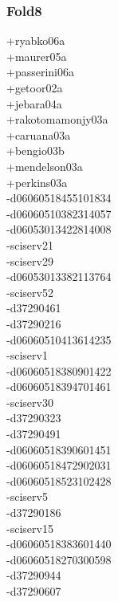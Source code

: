 \begin{multicols}{4}
\subsubsection*{Fold8}
+ryabko06a\\
+maurer05a\\
+passerini06a\\
+getoor02a\\
+jebara04a\\
+rakotomamonjy03a\\
+caruana03a\\
+bengio03b\\
+mendelson03a\\
+perkins03a\\
-d06060518455101834\\
-d06060510382314057\\
-d06053013422814008\\
-sciserv21\\
-sciserv29\\
-d06053013382113764\\
-sciserv52\\
-d37290461\\
-d37290216\\
-d06060510413614235\\
-sciserv1\\
-d06060518380901422\\
-d06060518394701461\\
-sciserv30\\
-d37290323\\
-d37290491\\
-d06060518390601451\\
-d06060518472902031\\
-d06060518523102428\\
-sciserv5\\
-d37290186\\
-sciserv15\\
-d06060518383601440\\
-d06060518270300598\\
-d37290944\\
-d37290607\\

\end{multicols}
